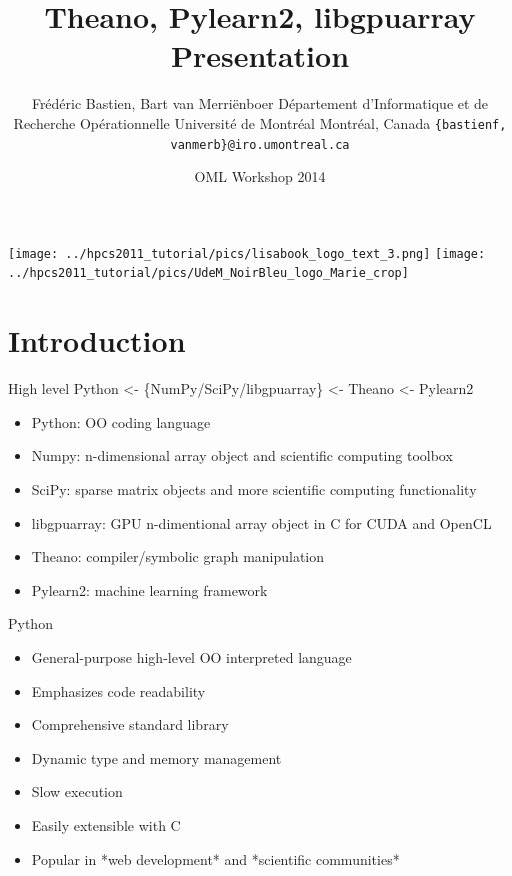 \documentclass[utf8x,xcolor=pdftex,dvipsnames,table]{beamer}
\title{Theano, Pylearn2, libgpuarray Presentation}
\author{%
\footnotesize
Frédéric Bastien, Bart van Merriënboer \newline
Département d'Informatique et de Recherche Opérationnelle \newline
Université de Montréal \newline
Montréal, Canada \newline
\texttt{\{bastienf, vanmerb\}@iro.umontreal.ca} \newline \newline
}
\date{OML Workshop 2014}
\begin{document}
\begin{frame}[plain]
 \titlepage
 \vspace{-5em}
 \texttt{[image: ../hpcs2011\_tutorial/pics/lisabook\_logo\_text\_3.png]}
 \hfill
 \texttt{[image: ../hpcs2011\_tutorial/pics/UdeM\_NoirBleu\_logo\_Marie\_crop]}
\end{frame}

\section{Introduction}
\begin{frame}{High level}\setcounter{page}{1}
  Python <- \{NumPy/SciPy/libgpuarray\} <- Theano <- Pylearn2
  \begin{itemize}
  \item Python: OO coding language
  \item Numpy: n-dimensional array object and scientific computing toolbox
  \item SciPy: sparse matrix objects and more scientific computing functionality
  \item libgpuarray: GPU n-dimentional array object in C for CUDA and OpenCL
  \item Theano: compiler/symbolic graph manipulation
  \item Pylearn2: machine learning framework
  \end{itemize}
\end{frame}

\begin{frame}{Python}
  \begin{itemize}
  \item General-purpose high-level OO interpreted language
  \item Emphasizes code readability
  \item Comprehensive standard library
  \item Dynamic type and memory management
  \item Slow execution
  \item Easily extensible with C
  \item Popular in *web development* and *scientific communities*
  \end{itemize}
\end{frame}
\end{document}
